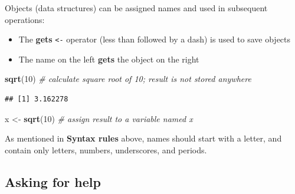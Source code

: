 \documentclass[]{book}
\newenvironment{Shaded}{\begin{snugshade}}{\end{snugshade}}
\newcommand{\CommentTok}[1]{\textcolor[rgb]{0.56,0.35,0.01}{\textit{#1}}}
\newcommand{\DecValTok}[1]{\textcolor[rgb]{0.00,0.00,0.81}{#1}}
\newcommand{\KeywordTok}[1]{\textcolor[rgb]{0.13,0.29,0.53}{\textbf{#1}}}
\newcommand{\NormalTok}[1]{#1}
\newcommand{\StringTok}[1]{\textcolor[rgb]{0.31,0.60,0.02}{#1}}
\providecommand{\tightlist}{%
  \setlength{\itemsep}{0pt}\setlength{\parskip}{0pt}}
\begin{document}
Objects (data structures) can be assigned names and used in subsequent operations:

\begin{itemize}
\tightlist
\item
  The \textbf{gets} \texttt{\textless{}-} operator (less than followed by a dash) is used to save objects
\item
  The name on the left \textbf{gets} the object on the right
\end{itemize}

\begin{Shaded}
\begin{Highlighting}[]
\KeywordTok{sqrt}\NormalTok{(}\DecValTok{10}\NormalTok{) }\CommentTok{# calculate square root of 10; result is not stored anywhere}
\end{Highlighting}
\end{Shaded}

\begin{verbatim}
## [1] 3.162278
\end{verbatim}

\begin{Shaded}
\begin{Highlighting}[]
\NormalTok{x <-}\StringTok{ }\KeywordTok{sqrt}\NormalTok{(}\DecValTok{10}\NormalTok{) }\CommentTok{# assign result to a variable named x}
\end{Highlighting}
\end{Shaded}

As mentioned in \textbf{Syntax rules} above, names should start with a letter, and contain only letters, numbers, underscores, and periods.

\hypertarget{asking-for-help}{%
\subsection{Asking for help}\label{asking-for-help}}
\end{document}
